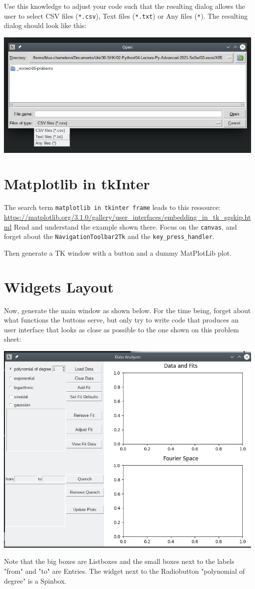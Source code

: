 \documentclass[
	english,
	fontsize=10pt,
	parskip=half,
	titlepage=true,
	DIV=12
]{scrartcl}
\begin{document}
Use this knowledge to adjust your code such that the resulting dialog allows the user to select CSV files (\texttt{*.csv}), Text files (\texttt{*.txt}) or Any files (\texttt{*}). The resulting dialog should look like this:
\begin{center}
	\includegraphics[width=.6\linewidth]{./tk-filepicker}
\end{center}

\section{Matplotlib in tkInter}
The search term \texttt{matplotlib in tkinter frame} leads to this ressource: \url{https://matplotlib.org/3.1.0/gallery/user_interfaces/embedding_in_tk_sgskip.html}
Read and understand the example shown there. Focus on the \texttt{canvas}, and forget about the \texttt{NavigationToolbar2Tk} and the \texttt{key\_press\_handler}.

Then generate a TK window with a button and a dummy MatPlotLib plot.

\section{Widgets Layout}
Now, generate the main window as shown below. For the time being, forget about what functions the buttons serve, but only try to write code that produces an user interface that looks as close as possible to the one shown on this problem sheet:
\begin{center}
	\includegraphics[width=.8\linewidth]{./tk-MainWin}
\end{center}
Note that the big boxes are Listboxes and the small boxes next to the labels "from" and "to" are Entries. The widget next to the Radiobutton "polynomial of degree" is a Spinbox.
\end{document}
